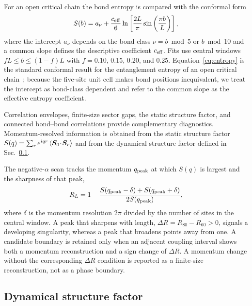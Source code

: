 For an open critical chain the bond entropy is compared with the conformal form
\begin{equation}
S(b)=a_\nu+\frac{c_{\mathrm{eff}}}{6}
\ln\left[\frac{2L}{\pi}\sin\left(\frac{\pi b}{L}\right)\right],
\label{eq:entropy}
\end{equation}
where the intercept $a_\nu$ depends on the bond class $\nu=b\bmod 5$ or $b\bmod 10$
and a common slope defines the descriptive coefficient $c_{\mathrm{eff}}$.
Fits use central windows $fL\le b\le(1-f)L$ with $f=0.10$, 0.15, 0.20, and 0.25.
Equation~\eqref{eq:entropy} is the standard conformal result for the entanglement
entropy of an open critical
chain~\cite{calabrese2004,giamarchi2003}; because the five-site unit cell makes
bond positions inequivalent, we treat the intercept as bond-class dependent and
refer to the common slope as the effective entropy coefficient.

Correlation envelopes, finite-size sector gaps, the static structure factor, and
connected bond--bond correlations provide complementary diagnostics.
Momentum-resolved information is obtained from the static structure factor
$S(q)=\sum_{r}e^{iqr}\left\langle \bm S_0\!\cdot\!\bm S_r\right\rangle$ and from the dynamical
structure factor defined in Sec.~\ref{sec:dsf}.

The negative-$\alpha$ scan tracks the momentum $q_{\mathrm{peak}}$ at which $S(q)$ is
largest and the sharpness of that peak,
\begin{equation}
R_L=1-\frac{S(q_{\mathrm{peak}}-\delta)+S(q_{\mathrm{peak}}+\delta)}{2S(q_{\mathrm{peak}})},
\label{eq:ratio}
\end{equation}
where $\delta$ is the momentum resolution $2\pi$ divided by the number of sites
in the central window.
A peak that sharpens with length, $\Delta R=R_{80}-R_{60}>0$, signals a developing
singularity, whereas a peak that broadens points away from one.
A candidate boundary is retained only when an adjacent coupling interval shows
both a momentum reconstruction and a sign change of $\Delta R$.
A momentum change without the corresponding $\Delta R$ condition is reported as
a finite-size reconstruction, not as a phase boundary.

\subsection{Dynamical structure factor}
\label{sec:dsf}

